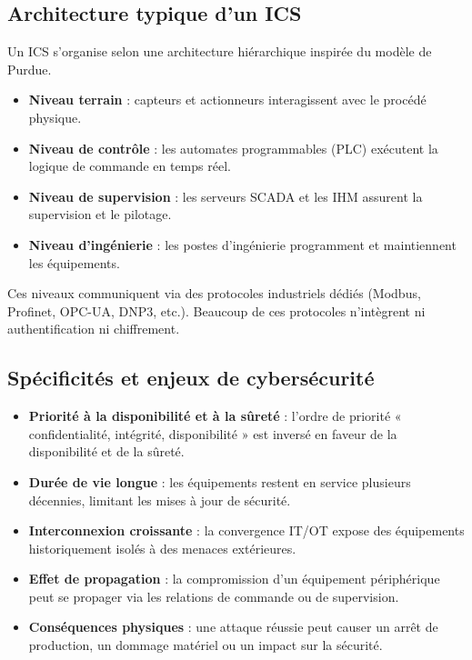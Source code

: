 \documentclass[12pt,a4paper]{article}
\newcommand{\forcereset}[1]{}
\begin{document}
\subsection{Architecture typique d'un ICS}
\forcereset{5}

Un ICS s'organise selon une architecture hiérarchique inspirée du modèle de Purdue.

\begin{itemize}
    \item \textbf{Niveau terrain} : capteurs et actionneurs interagissent avec le procédé physique.
    \item \textbf{Niveau de contrôle} : les automates programmables (PLC) exécutent la logique de commande en temps réel.
    \item \textbf{Niveau de supervision} : les serveurs SCADA et les IHM assurent la supervision et le pilotage.
    \item \textbf{Niveau d'ingénierie} : les postes d'ingénierie programment et maintiennent les équipements.
\end{itemize}

Ces niveaux communiquent via des protocoles industriels dédiés (Modbus, Profinet, OPC-UA, DNP3, etc.). Beaucoup de ces protocoles n'intègrent ni authentification ni chiffrement.

\subsection{Spécificités et enjeux de cybersécurité}
\forcereset{5}

\begin{itemize}[leftmargin=1.2cm, itemsep=0.2\baselineskip]
    \item \textbf{Priorité à la disponibilité et à la sûreté} : l'ordre de priorité « confidentialité, intégrité, disponibilité » est inversé en faveur de la disponibilité et de la sûreté.
    \item \textbf{Durée de vie longue} : les équipements restent en service plusieurs décennies, limitant les mises à jour de sécurité.
    \item \textbf{Interconnexion croissante} : la convergence IT/OT expose des équipements historiquement isolés à des menaces extérieures.
    \item \textbf{Effet de propagation} : la compromission d'un équipement périphérique peut se propager via les relations de commande ou de supervision.
    \item \textbf{Conséquences physiques} : une attaque réussie peut causer un arrêt de production, un dommage matériel ou un impact sur la sécurité.
\end{itemize}
\end{document}
